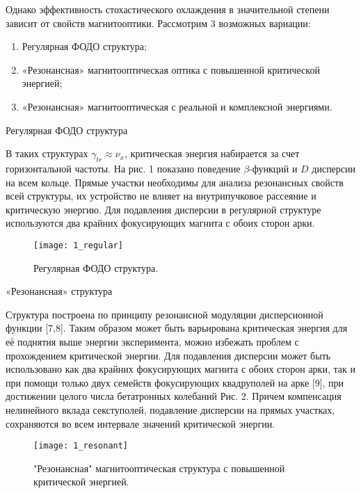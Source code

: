 \noindent Однако эффективность стохастического охлаждения в значительной степени зависит от свойств магнитооптики. Рассмотрим 3 возможных вариации:
\begin{enumerate}
\item Регулярная ФОДО структура;
\item «Резонансная» магнитооптическая оптика с повышенной критической энергией;
\item «Резонансная» магнитооптическая с реальной и комплексной энергиями.
\end{enumerate}

\par Регулярная ФОДО структура
 \par В таких структурах $\gamma_{tr}\approx\nu_x$, критическая энергия набирается за счет горизонтальной частоты. На рис. 1 показано поведение $\beta$-функций и $D$ дисперсии на всем кольце.  Прямые участки необходимы для анализа резонансных свойств всей структуры, их устройство не влияет на внутрипучковое рассеяние и критическую энергию. Для подавления дисперсии в регулярной структуре используются два крайних фокусирующих магнита с обоих сторон арки.

\begin{figure}[!h]
  \centering
   \texttt{[image: 1\_regular]}
   \caption{Регулярная ФОДО структура.}
   \label{fig:1_regular}
\end{figure}


\par «Резонансная» структура
 \par Структура построена по принципу резонансной модуляции дисперсионной функции [7,8]. Таким образом может быть варьирована критическая энергия для её поднятия выше энергии эксперимента, можно избежать проблем с прохождением критической энергии. Для подавления дисперсии может быть использовано как два крайних фокусирующих магнита с обоих сторон арки, так и при помощи только двух семейств фокусирующих квадруполей на арке [9], при достижении целого числа бетатронных колебаний Рис. 2. Причем компенсация нелинейного вклада секступолей, подавление дисперсии на прямых участках, сохраняются во всем интервале значений критической энергии.

\begin{figure}[!h]
  \centering
   \texttt{[image: 1\_resonant]}
   \caption{"Резонансная" магнитооптическая структура с повышенной критической энергией.}
   \label{fig:1_resonant}
\end{figure}

